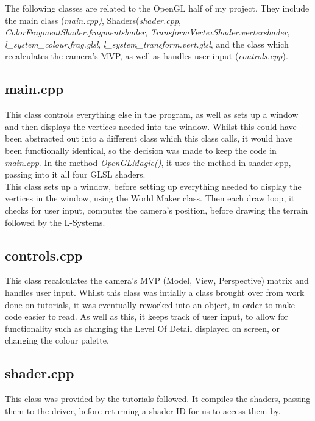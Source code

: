 \documentclass[a4paper,10pt]{report}
\begin{document}
The following classes are related to the OpenGL half of my project. They include the main class (\textit{main.cpp)}, Shaders(\textit{shader.cpp}, \textit{ColorFragmentShader.fragmentshader}, \textit{TransformVertexShader.vertexshader}, \textit{l\_system\_colour.frag.glsl}, \textit{l\_system\_transform.vert.glsl}, and the class which recalculates the camera's MVP, as well as handles user input (\textit{controls.cpp}). 

\subsection{main.cpp} 

This class controls everything else in the program, as well as sets up a window and then displays the vertices needed into the window. Whilst this could have been abstracted out into a different class which this class calls, it would have been functionally identical, so the decision was made to keep the code in \textit{main.cpp}. In the method \textit{OpenGLMagic()}, it uses the method in shader.cpp, passing into it all four GLSL shaders. \\

This class sets up a window, before setting up everything needed to display the vertices in the window, using the World Maker class. Then each draw loop, it checks for user input, computes the camera's position, before drawing the terrain followed by the L-Systems.


\subsection{controls.cpp}

This class recalculates the camera's MVP (Model, View, Perspective) matrix and handles user input. Whilst this class was intially a class brought over from work done on tutorials, it was eventually reworked into an object, in order to make code easier to read. As well as this, it keeps track of user input, to allow for functionality such as changing the Level Of Detail displayed on screen, or changing the colour palette. 

\subsection{shader.cpp}
This class was provided by the tutorials followed. It compiles the shaders, passing them to the driver, before returning a shader ID for us to access them by. 
\end{document}
